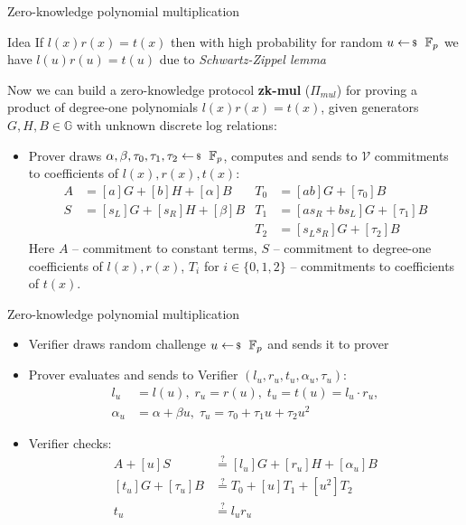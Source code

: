 \documentclass{zkdl-presentation-template}
\begin{document}
    \begin{frame}{Zero-knowledge polynomial multiplication}
        \begin{block}{Idea}
            If $l(x)r(x) = t(x)$ then with high probability for random $u \leftarrowS \mathbb{F}_p$ we have $l(u)r(u) = t(u)$ due to \textit{Schwartz-Zippel lemma}
        \end{block}
        \pause
        Now we can build a zero-knowledge protocol \textbf{zk-mul} ($\Pi_{mul}$) for proving a product of degree-one polynomials $l(x)r(x) = t(x)$, given generators $G,H,B \in \mathbb{G}$ with unknown discrete log relations:
        \begin{itemize}
            \item Prover draws $\alpha, \beta, \tau_0, \tau_1, \tau_2 \leftarrowS \mathbb{F}_p$, computes and sends to $\mathcal{V}$ commitments to coefficients of $l(x), r(x), t(x)$:
                \begin{align*}
                    A &= [a]G + [b]H + [\alpha]B & T_0 &= [ab]G + [\tau_0]B\\
                    S &= [s_L]G + [s_R]H + [\beta]B &T_1 &= [as_R + bs_L]G + [\tau_1]B\\
                    &&T_2 &= [s_Ls_R]G + [\tau_2]B
                \end{align*}
            Here $A$ -- commitment to constant terms, $S$ -- commitment to degree-one coefficients of $l(x),r(x)$, $T_{i}$ for $i \in \{0,1,2\}$ -- commitments to coefficients of $t(x)$.
        \end{itemize}
    \end{frame}

    \begin{frame}{Zero-knowledge polynomial multiplication}
        \begin{itemize}
            \item Verifier draws random challenge $u \leftarrowS \mathbb{F}_p$ and sends it to prover\pause
            \item Prover evaluates and sends to Verifier $(l_u, r_u, t_u, \alpha_u, \tau_u)$:
            \begin{align*}
                l_u &=l(u), \; r_u = r(u), \; t_u = t(u) = l_u \cdot r_u, \\
                \alpha_u &= \alpha + \beta u, \; \tau_u = \tau_0 + \tau_1 u + \tau_2 u^2
            \end{align*}
            \pause
            \item Verifier checks:
            \begin{align*}
                A + [u]S &\stackrel{?}{=} [l_u]G + [r_u]H + [\alpha_u]B \\
                [t_u]G + [\tau_u]B &\stackrel{?}{=} T_0 + [u]T_1 + [u^2]T_2 \\
                t_u &\stackrel{?}{=} l_u r_u
            \end{align*}
        \end{itemize}
    \end{frame}
\end{document}
